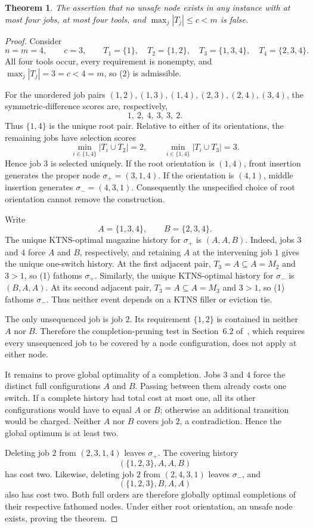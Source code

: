 \documentclass[11pt]{article}
\newtheorem{theorem}{Theorem}
\begin{document}
\begin{theorem}\label{thm:counterexample}
The assertion that no unsafe node exists in any instance with at most four
jobs, at most four tools, and
$\max_j|T_j|\leq c<m$ is false.
\end{theorem}

\begin{proof}
Consider
\[
 n=m=4,\qquad c=3,
 \qquad
 T_1=\{1\},\quad T_2=\{1,2\},\quad
 T_3=\{1,3,4\},\quad T_4=\{2,3,4\}.                         \tag{2}
\]
All four tools occur, every requirement is nonempty, and
$\max_j|T_j|=3=c<4=m$, so (2) is admissible.

For the unordered job pairs
$(1,2),(1,3),(1,4),(2,3),(2,4),(3,4)$, the symmetric-difference scores are,
respectively,
\[
  1,\ 2,\ 4,\ 3,\ 3,\ 2.                                   \tag{3}
\]
Thus $\{1,4\}$ is the unique root pair.  Relative to either of its
orientations, the remaining jobs have selection scores
\[
 \min_{i\in\{1,4\}}|T_i\cup T_2|=2,
 \qquad
 \min_{i\in\{1,4\}}|T_i\cup T_3|=3.                         \tag{4}
\]
Hence job $3$ is selected uniquely.  If the root orientation is $(1,4)$,
front insertion generates the proper node
$\sigma_+=(3,1,4)$.  If the orientation is $(4,1)$, middle insertion generates
$\sigma_-=(4,3,1)$.  Consequently the unspecified choice of root orientation
cannot remove the construction.

Write
\[
  A=\{1,3,4\},\qquad B=\{2,3,4\}.
\]
The unique KTNS-optimal magazine history for $\sigma_+$ is $(A,A,B)$.
Indeed, jobs $3$ and $4$ force $A$ and $B$, respectively, and retaining $A$
at the intervening job $1$ gives the unique one-switch history.  At the first
adjacent pair, $T_3=A\subseteq A=M_2$ and $3>1$, so (1) fathoms
$\sigma_+$.  Similarly, the unique KTNS-optimal history for $\sigma_-$ is
$(B,A,A)$.  At its second adjacent pair,
$T_3=A\subseteq A=M_3$ and $3>1$, so (1) fathoms $\sigma_-$.  Thus neither
event depends on a KTNS filler or eviction tie.

The only unsequenced job is job $2$.  Its requirement $\{1,2\}$ is contained
in neither $A$ nor $B$.  Therefore the completion-pruning test in Section~6.2
of~\cite{LocatelliCoteCoelho2026}, which requires every unsequenced job to be
covered by a node configuration, does not apply at either node.

It remains to prove global optimality of a completion.  Jobs $3$ and $4$
force the distinct full configurations $A$ and $B$.  Passing between them
already costs one switch.  If a complete history had total cost at most one,
all its other configurations would have to equal $A$ or $B$; otherwise an
additional transition would be charged.  Neither $A$ nor $B$ covers job $2$,
a contradiction.  Hence the global optimum is at least two.

Deleting job $2$ from $(2,3,1,4)$ leaves $\sigma_+$.  The covering history
\[
  (\{1,2,3\},A,A,B)
\]
has cost two.  Likewise, deleting job $2$ from $(2,4,3,1)$ leaves
$\sigma_-$, and
\[
  (\{1,2,3\},B,A,A)
\]
also has cost two.  Both full orders are therefore globally optimal
completions of their respective fathomed nodes.  Under either root
orientation, an unsafe node exists, proving the theorem.
\end{proof}
\end{document}
